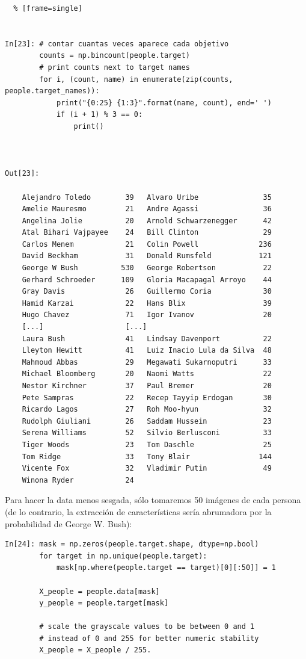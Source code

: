 \begin{lstlisting}  % [frame=single]	


In[23]: # contar cuantas veces aparece cada objetivo
        counts = np.bincount(people.target)
        # print counts next to target names
        for i, (count, name) in enumerate(zip(counts, people.target_names)):
            print("{0:25} {1:3}".format(name, count), end=' ')
            if (i + 1) % 3 == 0:
                print()



Out[23]:

    Alejandro Toledo        39   Alvaro Uribe               35
    Amelie Mauresmo         21   Andre Agassi               36
    Angelina Jolie          20   Arnold Schwarzenegger      42
    Atal Bihari Vajpayee    24   Bill Clinton               29
    Carlos Menem            21   Colin Powell              236
    David Beckham           31   Donald Rumsfeld           121
    George W Bush          530   George Robertson           22
    Gerhard Schroeder      109   Gloria Macapagal Arroyo    44
    Gray Davis              26   Guillermo Coria            30
    Hamid Karzai            22   Hans Blix                  39
    Hugo Chavez             71   Igor Ivanov                20
    [...]                   [...]
    Laura Bush              41   Lindsay Davenport          22
    Lleyton Hewitt          41   Luiz Inacio Lula da Silva  48
    Mahmoud Abbas           29   Megawati Sukarnoputri      33
    Michael Bloomberg       20   Naomi Watts                22
    Nestor Kirchner         37   Paul Bremer                20
    Pete Sampras            22   Recep Tayyip Erdogan       30
    Ricardo Lagos           27   Roh Moo-hyun               32
    Rudolph Giuliani        26   Saddam Hussein             23
    Serena Williams         52   Silvio Berlusconi          33
    Tiger Woods             23   Tom Daschle                25
    Tom Ridge               33   Tony Blair                144
    Vicente Fox             32   Vladimir Putin             49
    Winona Ryder            24

\end{lstlisting}



Para hacer la data  menos sesgada, sólo tomaremos  50 imágenes de cada persona (de lo contrario, la extracción de características sería abrumadora por la probabilidad de George W. Bush):\\


\begin{lstlisting}  
In[24]: mask = np.zeros(people.target.shape, dtype=np.bool)
        for target in np.unique(people.target):
            mask[np.where(people.target == target)[0][:50]] = 1
   
        X_people = people.data[mask]
        y_people = people.target[mask]
   
        # scale the grayscale values to be between 0 and 1
        # instead of 0 and 255 for better numeric stability
        X_people = X_people / 255.


\end{lstlisting} 

